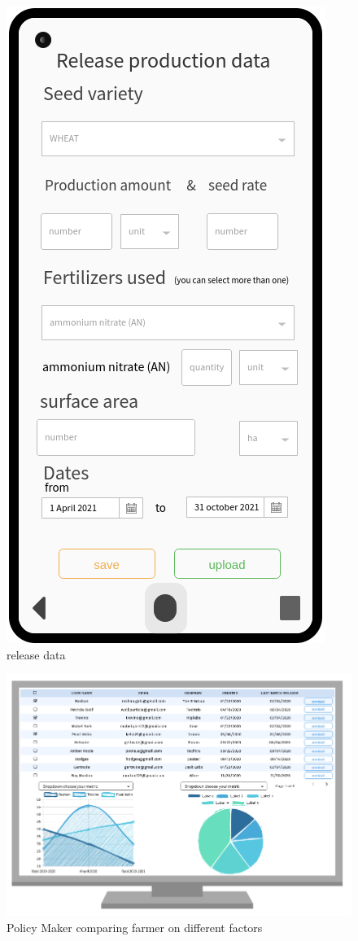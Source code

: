 \begin{figure}[H]
\begin{minipage}{0.48\textwidth}
		\label{Fig:interface_meteo}
		
	\end{minipage}\hfill
	
\end{figure}

\begin{figure}[H]
	
	\centering
	
	\includegraphics[width=0.3\columnwidth]{Images/release_prod_data.png}
	
	\caption{release data}
	
	\label{Fig:interface_release_data}
	
\end{figure}

\begin{figure}[H]
	
	\centering
	
	\includegraphics[width=0.8\columnwidth]{Images/visualize_farmers.png}
	
	\caption{Policy Maker comparing farmer on different factors}
	
	\label{Fig:interface_visu_farmers}
	
\end{figure}



